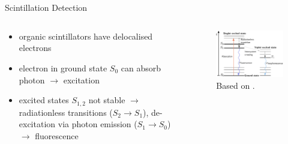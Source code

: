 \documentclass[aspectratio=169]{beamer}
\begin{document}
	\section{}
	
		\printbibliography
	 
	
	
\section{}
\begin{frame}{Scintillation Detection}
	
	\begin{columns}
		\begin{column}{0.5\textwidth}
			\begin{itemize}
				\item organic scintillators have delocalised electrons
				\item electron in ground state $S_0$ can absorb photon $\rightarrow$ excitation
				\item excited states $S_{1,2}$ not stable $\rightarrow$ radiationless transitions ($S_2 \rightarrow S_1$), de-excitation via photon emission ($S_1 \rightarrow S_0$) $\rightarrow$ fluorescence
			\end{itemize}
		\end{column}
		
		\begin{column}{0.5\textwidth}
			\begin{figure}
				\centering
				\includegraphics[width=\textwidth]{pictures/jablonski.pdf}
				\caption{Based on \cite{SCINTILLATION-TORRES}.}
			\end{figure}
		\end{column}
	\end{columns}
	
\end{frame}
\end{document}
